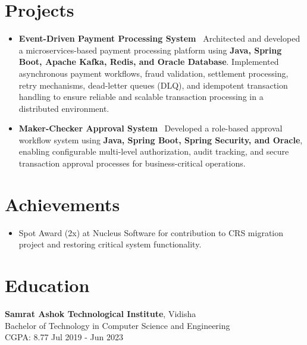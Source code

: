 \documentclass[a4paper,10pt]{article}
\begin{document}
\section*{Projects}
\vspace{-4pt}
\begin{itemize}[leftmargin=*]

\item \textbf{Event-Driven Payment Processing System} \
Architected and developed a microservices-based payment processing platform using \textbf{Java, Spring Boot, Apache Kafka, Redis, and Oracle Database}. Implemented asynchronous payment workflows, fraud validation, settlement processing, retry mechanisms, dead-letter queues (DLQ), and idempotent transaction handling to ensure reliable and scalable transaction processing in a distributed environment.

\vspace{-5pt}

\item \textbf{Maker-Checker Approval System} \
Developed a role-based approval workflow system using \textbf{Java, Spring Boot, Spring Security, and Oracle}, enabling configurable multi-level authorization, audit tracking, and secure transaction approval processes for business-critical operations.


\end{itemize}

\vspace{-16pt}
\section*{Achievements}
\vspace{-4pt}
\begin{itemize}[leftmargin=*]
\item Spot Award (2x) at Nucleus Software for contribution to CRS migration project and restoring critical system functionality.
\end{itemize}

\vspace{-16pt}
\section*{Education}
\vspace{-4pt}
\textbf{Samrat Ashok Technological Institute}, Vidisha \\
Bachelor of Technology in Computer Science and Engineering \\
CGPA: 8.77 \hfill Jul 2019 - Jun 2023
\end{document}

